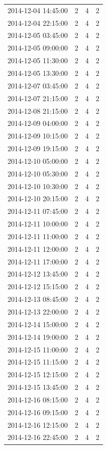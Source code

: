 \begin{tabular}{lrrr}
2014-12-04 14:45:00 & 2 & 4 & 2 \\
2014-12-04 22:15:00 & 2 & 4 & 2 \\
2014-12-05 03:45:00 & 2 & 4 & 2 \\
2014-12-05 09:00:00 & 2 & 4 & 2 \\
2014-12-05 11:30:00 & 2 & 4 & 2 \\
2014-12-05 13:30:00 & 2 & 4 & 2 \\
2014-12-07 03:45:00 & 2 & 4 & 2 \\
2014-12-07 21:15:00 & 2 & 4 & 2 \\
2014-12-08 21:15:00 & 2 & 4 & 2 \\
2014-12-09 04:00:00 & 2 & 4 & 2 \\
2014-12-09 10:15:00 & 2 & 4 & 2 \\
2014-12-09 19:15:00 & 2 & 4 & 2 \\
2014-12-10 05:00:00 & 2 & 4 & 2 \\
2014-12-10 05:30:00 & 2 & 4 & 2 \\
2014-12-10 10:30:00 & 2 & 4 & 2 \\
2014-12-10 20:15:00 & 2 & 4 & 2 \\
2014-12-11 07:45:00 & 2 & 4 & 2 \\
2014-12-11 10:00:00 & 2 & 4 & 2 \\
2014-12-11 11:00:00 & 2 & 4 & 2 \\
2014-12-11 12:00:00 & 2 & 4 & 2 \\
2014-12-11 17:00:00 & 2 & 4 & 2 \\
2014-12-12 13:45:00 & 2 & 4 & 2 \\
2014-12-12 15:15:00 & 2 & 4 & 2 \\
2014-12-13 08:45:00 & 2 & 4 & 2 \\
2014-12-13 22:00:00 & 2 & 4 & 2 \\
2014-12-14 15:00:00 & 2 & 4 & 2 \\
2014-12-14 19:00:00 & 2 & 4 & 2 \\
2014-12-15 11:00:00 & 2 & 4 & 2 \\
2014-12-15 11:15:00 & 2 & 4 & 2 \\
2014-12-15 12:15:00 & 2 & 4 & 2 \\
2014-12-15 13:45:00 & 2 & 4 & 2 \\
2014-12-16 08:15:00 & 2 & 4 & 2 \\
2014-12-16 09:15:00 & 2 & 4 & 2 \\
2014-12-16 12:15:00 & 2 & 4 & 2 \\
2014-12-16 22:45:00 & 2 & 4 & 2 \\

\end{tabular}
